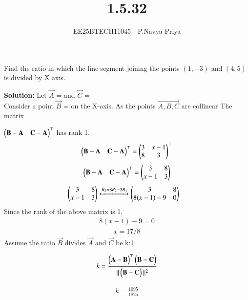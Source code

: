 \documentclass[journal,12pt,onecolumn]{IEEEtran}
\theoremstyle{remark}
\begin{document}
\title{1.5.32}
\author{EE25BTECH11045 - P.Navya Priya}
\maketitle
\renewcommand{\thefigure}{\theenumi}
\renewcommand{\thetable}{\theenumi}

\vspace{1cm}

 Find the ratio in which the line segment joining the points $(1,-3)$ and $(4,5)$ is divided
 by X axis.

\vspace{0.75cm}
\textbf{Solution:} Let $\vec{A}$ =  and $\vec{C}$ = \\[5pt]

Consider a point $\vec{B}$ =  on the X-axis.
As the points $\vec{A,B,C}$ are collinear
The matrix 

$\begin{pmatrix} \mathbf{B}-\mathbf{A} & \mathbf{C}-\mathbf{A} \end{pmatrix}^\top$ has rank 1.
\begin{align}
\begin{pmatrix} \mathbf{B}-\mathbf{A} & \mathbf{C}-\mathbf{A} \end{pmatrix}^\top = \begin{pmatrix}3&x-1\\8&3\end{pmatrix}^\top
\end{align}
\begin{align}
\begin{pmatrix} \mathbf{B}-\mathbf{A} & \mathbf{C}-\mathbf{A} \end{pmatrix}^\top = \begin{pmatrix}3&8\\x-1&3\end{pmatrix}
\end{align}
\begin{align}
\begin{pmatrix}3&8\\x-1&3\end{pmatrix}
 &\xleftrightarrow{R_2 = 8R_2 - 3R_1}
 \begin{pmatrix}3&8\\8(x-1)-9&0\end{pmatrix}
\end{align}
Since the rank of the above matrix is 1,
\begin{align}
    8(x-1)-9 = 0
\end{align}
\begin{align}
    x = 17/8
\end{align}
Assume the ratio $\vec{B}$ divides $\vec{A}$  and $\vec{C}$ be k:1

\begin{align}
    k = \frac{\begin{pmatrix}\mathbf{A} - \mathbf{B}\end{pmatrix}^\top \begin{pmatrix}\mathbf{B} - \mathbf{C}\end{pmatrix}}{||\begin{pmatrix}\mathbf{B} - \mathbf{C}\end{pmatrix}||^2}
\end{align}

\begin{align}
    k = \frac{1095}{1825}
\end{align}
\end{document}
